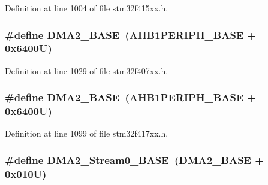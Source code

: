 Definition at line 1004 of file stm32f415xx.\+h.

\subsubsection[{\texorpdfstring{D\+M\+A2\+\_\+\+B\+A\+SE}{DMA2_BASE}}]{\setlength{\rightskip}{0pt plus 5cm}\#define D\+M\+A2\+\_\+\+B\+A\+SE~({\bf A\+H\+B1\+P\+E\+R\+I\+P\+H\+\_\+\+B\+A\+SE} + 0x6400\+U)}\hypertarget{group___peripheral__registers__structures_gab72a9ae145053ee13d1d491fb5c1df64}{}\label{group___peripheral__registers__structures_gab72a9ae145053ee13d1d491fb5c1df64}


Definition at line 1029 of file stm32f407xx.\+h.

\subsubsection[{\texorpdfstring{D\+M\+A2\+\_\+\+B\+A\+SE}{DMA2_BASE}}]{\setlength{\rightskip}{0pt plus 5cm}\#define D\+M\+A2\+\_\+\+B\+A\+SE~({\bf A\+H\+B1\+P\+E\+R\+I\+P\+H\+\_\+\+B\+A\+SE} + 0x6400\+U)}\hypertarget{group___peripheral__registers__structures_gab72a9ae145053ee13d1d491fb5c1df64}{}\label{group___peripheral__registers__structures_gab72a9ae145053ee13d1d491fb5c1df64}


Definition at line 1099 of file stm32f417xx.\+h.

\subsubsection[{\texorpdfstring{D\+M\+A2\+\_\+\+Stream0\+\_\+\+B\+A\+SE}{DMA2_Stream0_BASE}}]{\setlength{\rightskip}{0pt plus 5cm}\#define D\+M\+A2\+\_\+\+Stream0\+\_\+\+B\+A\+SE~({\bf D\+M\+A2\+\_\+\+B\+A\+SE} + 0x010\+U)}\hypertarget{group___peripheral__registers__structures_gac4c67b24726ba6b94d03adb351bcec4d}{}\label{group___peripheral__registers__structures_gac4c67b24726ba6b94d03adb351bcec4d}



